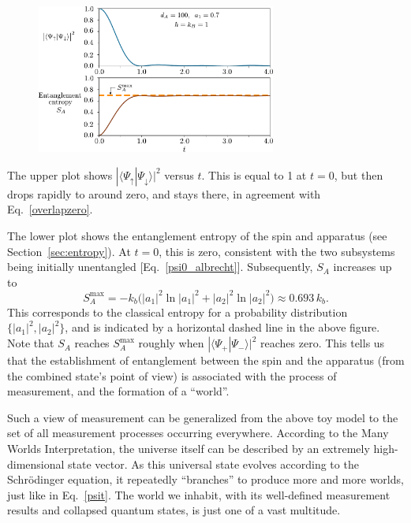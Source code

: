 \documentclass[prx,12pt]{revtex4-2}
\begin{document}
\begin{figure}[h]
  \centering\includegraphics[width=0.7\textwidth]{decoherence}
\end{figure}

The upper plot shows $|\langle\Psi_\uparrow|\Psi_\downarrow\rangle|^2$
versus $t$.  This is equal to 1 at $t = 0$, but then drops rapidly to
around zero, and stays there, in agreement with
Eq.~\eqref{overlapzero}.

The lower plot shows the entanglement entropy of the spin and
apparatus (see Section~\ref{sec:entropy}).  At $t = 0$, this is zero,
consistent with the two subsystems being initially unentangled
[Eq.~\eqref{psi0_albrecht}].  Subsequently, $S_A$ increases up to
\begin{equation}
  S_A^{\mathrm{max}} = - k_b \Big( |a_1|^2 \ln|a_1|^2 + |a_2|^2\ln|a_2|^2 \Big) \approx 0.693 \,k_b.
\end{equation}
This corresponds to the classical entropy for a probability
distribution $\{|a_1|^2,|a_2|^2\}$, and is indicated by a horizontal
dashed line in the above figure.  Note that $S_A$ reaches
$S_A^{\mathrm{max}}$ roughly when $|\langle\Psi_+|\Psi_-\rangle|^2$
reaches zero.  This tells us that the establishment of entanglement
between the spin and the apparatus (from the combined state's point of
view) is associated with the process of measurement, and the formation
of a ``world''.

Such a view of measurement can be generalized from the above toy model
to the set of all measurement processes occurring everywhere.
According to the Many Worlds Interpretation, the universe itself can
be described by an extremely high-dimensional state vector.  As this
universal state evolves according to the Schr\"odinger equation, it
repeatedly ``branches'' to produce more and more worlds, just like in
Eq.~\eqref{psit}.  The world we inhabit, with its well-defined
measurement results and collapsed quantum states, is just one of a
vast multitude.
\end{document}
